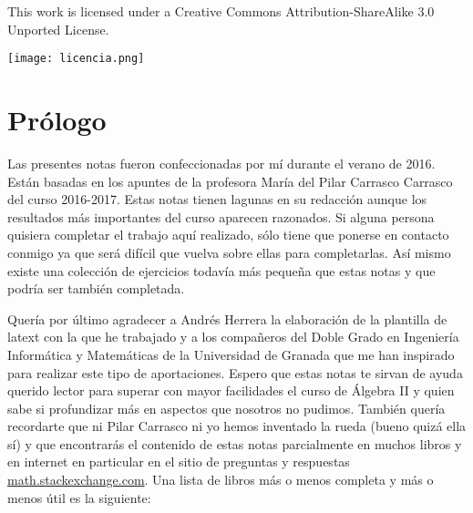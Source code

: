 \documentclass{article}
\theoremstyle{theorem-style}  %
\theoremstyle{definition-style}
\theoremstyle{example-style}
\begin{document}
\makeatletter\renewcommand{\ALG@name}{Algoritmo}

\maketitle



\newpage
\tableofcontents
\newpage

\begin{mdframed}[outerlinecolor=black,outerlinewidth=2pt,linecolor=cccolor,middlelinewidth=3pt,roundcorner=10pt]
  This work is licensed under a Creative Commons Attribution-ShareAlike 3.0 Unported License.
  \begin{center}
    \texttt{[image: licencia.png]}
  \end{center}
\end{mdframed}

\newpage 
\section{Prólogo}

Las presentes notas fueron confeccionadas por mí durante el verano de 2016. Están basadas en los apuntes de la profesora María del Pilar Carrasco Carrasco del curso 2016-2017. Estas notas tienen lagunas en su redacción aunque los resultados más importantes del curso aparecen razonados. Si alguna persona quisiera completar el trabajo aquí realizado, sólo tiene que ponerse en contacto conmigo ya que será difícil que vuelva sobre ellas para completarlas. Así mismo existe una colección de ejercicios todavía más pequeña que estas notas y que podría ser también completada. 

Quería por último agradecer a Andrés Herrera la elaboración de la plantilla de latext con la que he trabajado y a los compañeros del Doble Grado en Ingeniería Informática y Matemáticas de la Universidad de Granada que me han inspirado para realizar este tipo de aportaciones. Espero que estas notas te sirvan de ayuda querido lector para superar con mayor facilidades el curso de Álgebra II y quien sabe si profundizar más en aspectos que nosotros no pudimos. También quería recordarte que ni Pilar Carrasco ni yo hemos inventado la rueda (bueno quizá ella sí) y que encontrarás el contenido de estas notas parcialmente en muchos libros y en internet en particular en el sitio de preguntas y respuestas \url{math.stackexchange.com}. Una lista de libros más o menos completa y más o menos útil es la siguiente:
\end{document}
